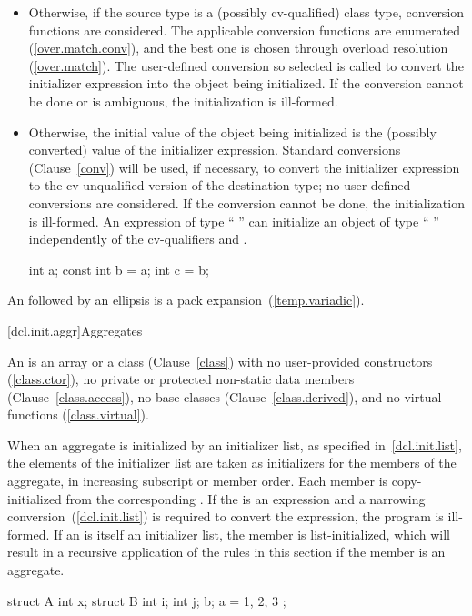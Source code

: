 \begin{itemize}
\item
Otherwise, if the source type
is a (possibly cv-qualified) class type, conversion functions are
considered.
The applicable conversion functions are enumerated
(\ref{over.match.conv}), and the best one is chosen through overload
resolution (\ref{over.match}).
The user-defined conversion so selected
is called to convert the initializer expression into the
object being initialized.
If the conversion cannot be done or is
ambiguous, the initialization is ill-formed.
\item
Otherwise, the initial value of the object being initialized is
the (possibly converted) value of the initializer expression.
Standard conversions (Clause~\ref{conv}) will be used, if necessary,
to convert the initializer expression to the cv-unqualified version of
the destination type;
no user-defined conversions are considered.
If the conversion cannot
be done, the initialization is ill-formed.
%
\enternote
An expression of type
`` ''
can initialize an object of type
`` ''
independently of
the cv-qualifiers
and .

\begin{codeblock}
int a;
const int b = a;
int c = b;
\end{codeblock}
\exitnote
\end{itemize}

\pnum
An  followed by an ellipsis is a
pack expansion~(\ref{temp.variadic}).

[dcl.init.aggr]{Aggregates}%
%
%
%
%
%
%

\pnum
An
is an array or a class (Clause~\ref{class}) with no
user-provided constructors (\ref{class.ctor}),
no private or protected non-static data members (Clause~\ref{class.access}),
no base classes (Clause~\ref{class.derived}),
and no virtual functions (\ref{class.virtual}).

\pnum
When an aggregate is initialized by an initializer list, as specified in~\ref{dcl.init.list}, the elements of the initializer list are taken as initializers
for the members of the aggregate,
in increasing subscript or member order.
Each member is copy-initialized from the corresponding . If the  is an expression and a narrowing conversion~(\ref{dcl.init.list}) is required to convert the expression, the program is ill-formed. \enternote If an  is itself an initializer list, the member is list-initialized, which will result in a recursive application of the rules in this section if the member is an aggregate. \exitnote
\enterexample
\begin{codeblock}
struct A {
  int x;
  struct B {
    int i;
    int j;
  } b;
} a = { 1, { 2, 3 } };
\end{codeblock}

